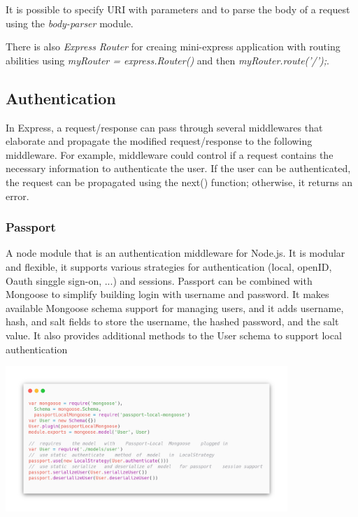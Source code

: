 It is possible to specify URI with parameters and to parse the body of a request using the \textit{body-parser} module.

There is also \textit{Express Router} for creaing mini-express application with routing abilities using \textit{myRouter = express.Router()} and then \textit{myRouter.route('/');}.

\subsection*{Authentication}
In Express, a request/response can pass through several middlewares that elaborate and propagate the modified request/response to the following middleware. For example, middleware could control if a request contains the necessary information to authenticate the user. If the user can be authenticated, the request can be propagated using the next() function; otherwise, it returns an error. 

\subsubsection*{Passport}
A node module that is an authentication middleware for Node.js. It is modular and flexible, it supports various strategies for authentication (local, openID, Oauth singgle sign-on, ...) and sessions.
Passport can be combined with Mongoose to simplify building login with username and password. It makes available Mongoose schema support for managing users, and it adds username, hash, and salt fields to store the username, the hashed password, and the salt value. It also provides additional methods to the User schema to support local authentication

\begin{center}
    \includegraphics[width=0.8\textwidth]{assets/passport-mongoose.png}
    \label{fig:passport-mongoose}
\end{center}

